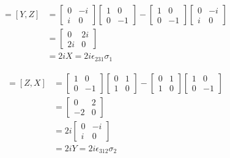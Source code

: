 \begin{align*}
	[\sigma_2,\sigma_3] = \left[Y, Z \right] &= \begin{bmatrix}
		0 & -i \\
		i & 0
	\end{bmatrix}
	\begin{bmatrix}
		1 & 0 \\
		0 & -1
	\end{bmatrix}
	-
	\begin{bmatrix}
		1 & 0 \\
		0 & -1
	\end{bmatrix}
	\begin{bmatrix}
		0 & -i \\
		i & 0
	\end{bmatrix}\\
	&=
	\begin{bmatrix}
		0 & 2i \\
		2i & 0
	\end{bmatrix}\\
	&= 2iX = 2i\epsilon_{231}\sigma_1
\end{align*}



\begin{align*}
	[\sigma_3,\sigma_1] = \left[Z, X\right] &= \begin{bmatrix}
	1 & 0 \\
	0 & -1
	\end{bmatrix}
	\begin{bmatrix}
	0 & 1 \\
	1 & 0
	\end{bmatrix}
	-
	\begin{bmatrix}
	0 & 1 \\
	1 & 0
	\end{bmatrix}
	\begin{bmatrix}
	1 & 0 \\
	0 & -1
	\end{bmatrix}\\
	&=\begin{bmatrix}
	0 & 2 \\
	-2 & 0
	\end{bmatrix}\\
	&=
	2i \begin{bmatrix}
	0 & -i \\
	i & 0
	\end{bmatrix}\\
	&= 2iY = 2i\epsilon_{312}\sigma_2
\end{align*}



